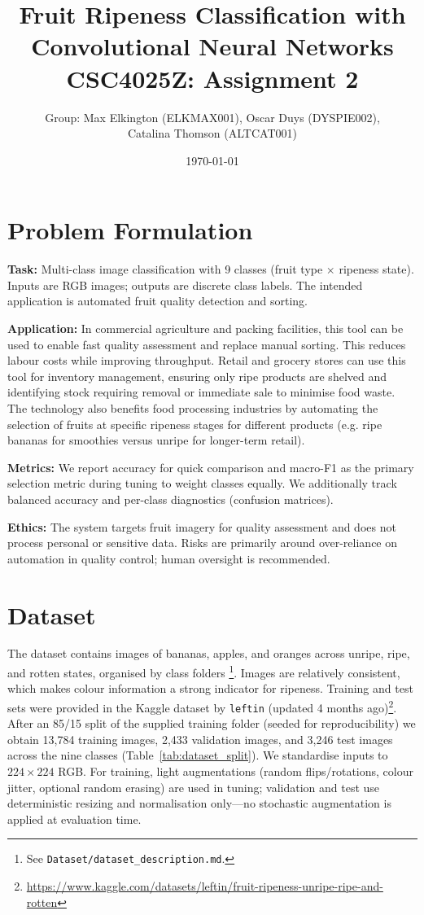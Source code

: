 \documentclass[11pt,a4paper]{article}
\title{Fruit Ripeness Classification with Convolutional Neural Networks\\\large CSC4025Z: Assignment 2}
\author{Group: Max Elkington (ELKMAX001), Oscar Duys (DYSPIE002),\\ Catalina Thomson (ALTCAT001)}
\date{\today}
\begin{document}
\maketitle

\section{Problem Formulation}
\textbf{Task:} Multi-class image classification with 9 classes (fruit type \(\times\) ripeness state). Inputs are RGB images; outputs are discrete class labels. The intended application is automated fruit quality detection and sorting.

\textbf{Application:} In commercial agriculture and packing facilities, this tool can be used to enable fast quality assessment and replace manual sorting. This reduces labour costs while improving throughput. Retail and grocery stores can use this tool for inventory management, ensuring only ripe products are shelved and identifying stock requiring removal or immediate sale to minimise food waste. The technology also benefits food processing industries by automating the selection of fruits at specific ripeness stages for different products (e.g. ripe bananas for smoothies versus unripe for longer-term retail).


\textbf{Metrics:} We report accuracy for quick comparison and macro-F1 as the primary selection metric during tuning to weight classes equally. We additionally track balanced accuracy and per-class diagnostics (confusion matrices).

\textbf{Ethics:} The system targets fruit imagery for quality assessment and does not process personal or sensitive data. Risks are primarily around over-reliance on automation in quality control; human oversight is recommended.

\section{Dataset}
The dataset contains images of bananas, apples, and oranges across unripe, ripe, and rotten states, organised by class folders \footnote{See \texttt{Dataset/dataset\_description.md}.}. Images are relatively consistent, which makes colour information a strong indicator for ripeness. Training and test sets were provided in the Kaggle dataset by \texttt{leftin} (updated 4 months ago)\footnote{\href{https://www.kaggle.com/datasets/leftin/fruit-ripeness-unripe-ripe-and-rotten}{https://www.kaggle.com/datasets/leftin/fruit-ripeness-unripe-ripe-and-rotten}}. After an 85/15 split of the supplied training folder (seeded for reproducibility) we obtain 13,784 training images, 2,433 validation images, and 3,246 test images across the nine classes (Table~\ref{tab:dataset_split}).
We standardise inputs to \(224\times224\) RGB. For training, light augmentations (random flips/rotations, colour jitter, optional random erasing) are used in tuning; validation and test use deterministic resizing and normalisation only—no stochastic augmentation is applied at evaluation time.
\end{document}

